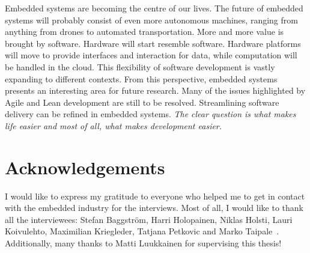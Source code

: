 \documentclass[english]{tktltiki2}
\begin{document}
Embedded systems are becoming the centre of our lives. The future of embedded systems will probably consist of even more autonomous machines, ranging from anything from drones to automated transportation. More and more value is brought by software. Hardware will start resemble software. Hardware platforms will move to provide interfaces and interaction for data, while computation will be handled in the cloud. This flexibility of software development is vastly expanding to different contexts. From this perspective, embedded systems presents an interesting area for future research. Many of the issues highlighted by Agile and Lean development are still to be resolved. Streamlining software delivery can be refined in embedded systems. \emph{The clear question is what makes life easier and most of all, what makes development easier.}


\section{Acknowledgements}

I would like to express my gratitude to everyone who helped me to get in contact with the embedded industry for the interviews. Most of all, I would like to thank all the interviewees: Stefan Baggström, Harri Holopainen, Niklas Holsti, Lauri Koivulehto, Maximilian Kriegleder, Tatjana Petkovic and Marko Taipale~\cite{BT15, Hol15a, Hol15b, Koi15, Kri15, Pet15}. Additionally, many thanks to Matti Luukkainen for supervising this thesis!




\end{document}
